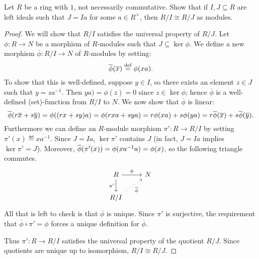 \documentclass{./typewriter-math}
\begin{document}
	\begin{exercise}
		Let \(R\) be a ring with \(1\), not necessarily commutative. Show that if
		\(I,J \subseteq R\) are left ideals such that \(J = Ia\) for some \(a \in
		R^\times\), then \(R/I \cong R/J\) as modules.

		\begin{proof}
			We will show that \(R/I\) satisfies the universal property of \(R/J\).
			Let \(\phi: R \to N\) be a morphism of \(R\)-modules such that \(J
			\subseteq \ker \phi\). We define a new morphism \(\overline{\phi}: R/I
			\to N\) of \(R\)-modules by setting:%
			\[%
				\overline{\phi}\pwrap{\overline{x}} \eqdef \phi\pwrap{x a}.
			\]%
			To show that this is well-defined, suppose \(y \in I\), so there exists
			an element \(z \in J\) such that \(y = z a^{-1}\). Then \(y a) = \phi(z)
			= 0\) since \(z \in \ker \phi\); hence \(\overline{\phi}\) is a
			well-defined (set)-function from \(R/I\) to \(N\). We now show that
			\(\overline{\phi}\) is linear:%
			\[%
				\overline{\phi}\pwrap{r \overline{x} + s \overline{y}} = \phi\pwrap{
				\pwrap{ r x + s y } a } = \phi\pwrap{ r x a + s y a } = r\phi(x a) + s
				\phi(y a) = r \overline{\phi}(\overline{x}) + s
				\overline{\phi}(\overline{y}).
			\]%
			Furthermore we can define an \(R\)-module morphism \(\pi': R \to R/I\) by
			setting \(\pi'(x) \eqdef \overline{x a^{-1}}\). Since \(J = I a\), \(\ker
			\pi'\) contains \(J\) (in fact, \(J = I a\) implies \(\ker \pi' = J\)).
			Moreover, \(\overline{\phi}{\left(\pi'(x)\right)} = \phi(x a^{-1} a) =
			\phi(x)\), so the following triangle commutes.%
			\[%
				\begin{tikzcd}%
					R \arrow[r,"\phi"] \arrow[d,"\pi'",swap] & N\\
					R/I \arrow[ur,"\overline{\phi}",dotted,swap] &
				\end{tikzcd}
			\]%
			All that is left to check is that \(\overline{\phi}\) is unique. Since
			\(\pi'\) is surjective, the requirement that \(\overline{\phi} \circ \pi'
			= \phi\) forces a unique definition for \(\overline{\phi}\).

			Thus \(\pi': R \to R/I\) satisfies the universal property of the quotient
			\(R/J\). Since quotients are unique up to isomorphism, \(R/I \cong R/J\).
		\end{proof}
	\end{exercise}
\end{document}
